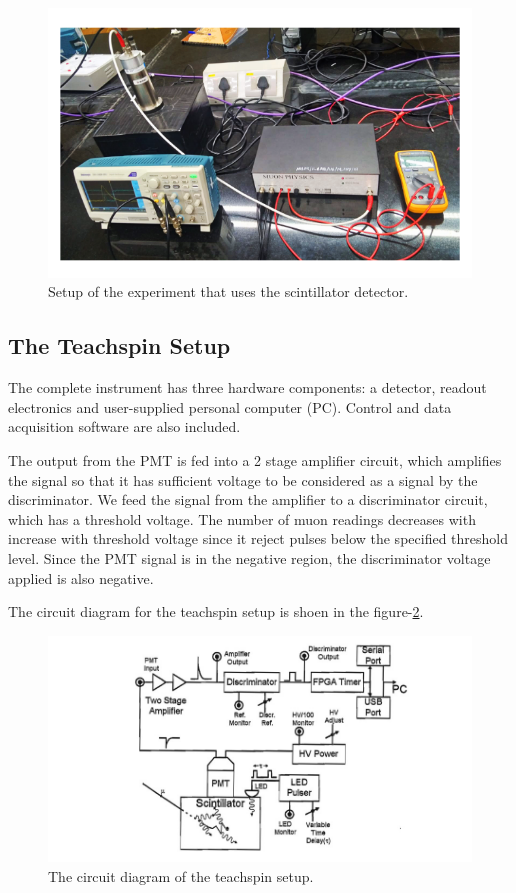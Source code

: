 \documentclass{article}
\begin{document}
\begin{multicols}{2}
\begin{figure}[H]
    \centering
    \includegraphics[width = \columnwidth]{Images/scintsetup.png}
    \caption{Setup of the experiment that uses the scintillator detector.}
    \label{scintsetup}
\end{figure}


\subsection{The Teachspin Setup}
The complete instrument has three hardware components: a detector, readout electronics and user-supplied personal computer (PC). Control and data acquisition software are also included.

The output from the PMT is fed into a 2 stage amplifier circuit, which amplifies the signal so that it has sufficient voltage to be considered as a signal by the discriminator. We feed the signal from the amplifier to a discriminator circuit, which has a threshold voltage. The number
of muon readings decreases with increase with threshold
voltage since it reject pulses below the specified threshold level. Since the PMT signal is in the negative region, the discriminator voltage applied is also negative.

The circuit diagram for the teachspin setup is shoen in the figure-\ref{circuit}.
\begin{figure}[H]
    \centering
    \includegraphics[width = \columnwidth]{Images/circuit.png}
    \caption{The circuit diagram of the teachspin setup.}
    \label{circuit}
\end{figure}


\end{multicols}
\end{document}
